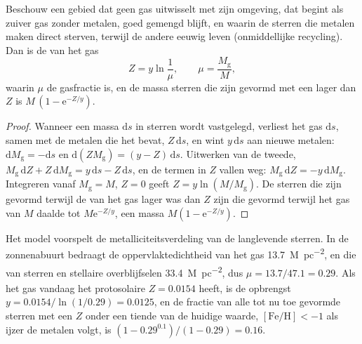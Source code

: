 \begin{theorem}\label{thm:b3:origin-of-elements:closed-box}
Beschouw een gebied dat geen gas uitwisselt met zijn omgeving, dat begint als
zuiver gas zonder metalen, goed gemengd blijft, en waarin de sterren die
metalen maken direct sterven, terwijl de andere eeuwig leven (onmiddellijke
recycling). Dan is de  van het gas
\[
Z = y \ln\frac{1}{\mu}, \qquad \mu = \frac{M_\mathrm{g}}{M},
\]
waarin $\mu$ de gasfractie is, en de massa sterren die zijn gevormd met een
 lager dan $Z$ is \mbox{$M\,(1 - \mathrm{e}^{-Z/y})$}.
\end{theorem}

\begin{proof}
Wanneer een massa $\mathrm{d}s$ in sterren wordt vastgelegd, verliest het gas
$\mathrm{d}s$, samen met de metalen die het bevat, $Z\,\mathrm{d}s$,
en wint $y\,\mathrm{d}s$ aan nieuwe metalen:
$\mathrm{d}M_\mathrm{g} = -\mathrm{d}s$ en
$\mathrm{d}(Z M_\mathrm{g}) = (y - Z)\,\mathrm{d}s$. Uitwerken van de
tweede, $M_\mathrm{g}\,\mathrm{d}Z + Z\,\mathrm{d}M_\mathrm{g} =
y\,\mathrm{d}s - Z\,\mathrm{d}s$, en de termen in $Z$ vallen weg:
$M_\mathrm{g}\,\mathrm{d}Z = -y\,\mathrm{d}M_\mathrm{g}$. Integreren
vanaf $M_\mathrm{g} = M$, $Z = 0$ geeft $Z = y\ln(M/M_\mathrm{g})$. De
sterren die zijn gevormd terwijl de  van het gas lager was dan $Z$ zijn die
gevormd terwijl het gas van $M$ daalde tot $M\mathrm{e}^{-Z/y}$, een massa
$M(1 - \mathrm{e}^{-Z/y})$.
\end{proof}

Het model voorspelt de metalliciteitsverdeling van de langlevende sterren.
In de zonnenabuurt bedraagt de oppervlaktedichtheid van het gas
\qty{13.7}{M_\odot.pc^{-2}}, en die van sterren en stellaire overblijfselen
\qty{33.4}{M_\odot.pc^{-2}}, dus $\mu = 13.7/47.1 = 0.29$. Als het gas
vandaag het protosolaire $Z = 0.0154$ heeft, is de opbrengst
$y = 0.0154/\ln(1/0.29) = 0.0125$, en de fractie van alle tot nu toe
gevormde sterren met een $Z$ onder een tiende van de huidige waarde,
$[\mathrm{Fe/H}] < -1$ als ijzer de metalen volgt, is
$(1 - 0.29^{0.1})/(1 - 0.29) = 0.16$.

